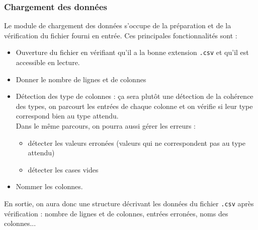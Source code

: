 			\subsubsection{Chargement des données}
				Le module de chargement des données s'occupe de la préparation et de la vérification du fichier fourni en entrée. Ces principales fonctionnalités sont :
				\begin{itemize}
				\item Ouverture du fichier en vérifiant qu'il a la bonne extension \lstinline!.csv! et qu'il est accessible en lecture.
				\item Donner le nombre de lignes et de colonnes
				\item Détection des type de colonnes : ça sera plutôt une détection de la cohérence des types, on parcourt les entrées de chaque colonne et on vérifie si leur type correspond bien au type attendu.\\
				Dans le même parcours, on pourra aussi gérer les erreurs :
					\begin{itemize}
					\item détecter les valeurs erronées (valeurs qui ne correspondent pas au type attendu)
					\item détecter les cases vides
					\end{itemize}
				\item Nommer les colonnes.
				\end{itemize}
				En sortie, on aura donc une structure décrivant les données du fichier \lstinline!.csv! après vérification : nombre de lignes et de colonnes, entrées erronées, noms des colonnes...
				
